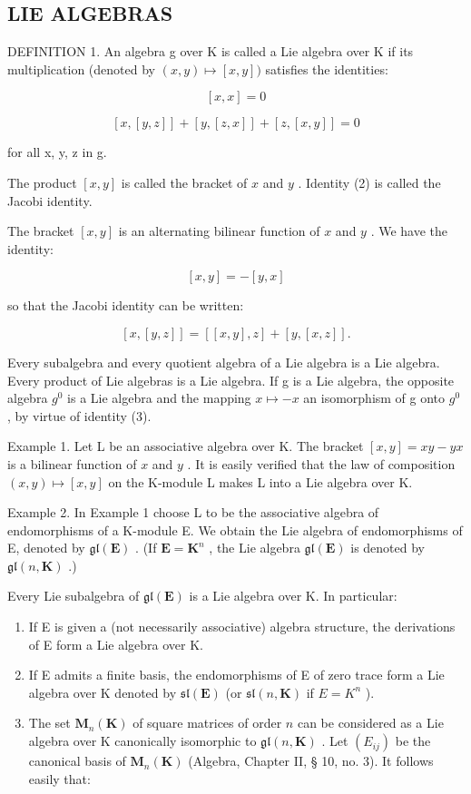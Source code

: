 \subsection{LIE ALGEBRAS}

DEFINITION 1. An algebra g over K is called a Lie algebra over K if its multiplication (denoted by \((x,y)\mapsto [x,y])\) satisfies the identities:

\[
[ x, x ] = 0\tag{1}
\]

\[
[ x, [ y, z ] ] + [ y, [ z, x ] ] + [ z, [ x, y ] ] = 0\tag{2}
\]

for all x, y, z in g.

The product \([x, y]\) is called the bracket of \(x\) and \(y\) . Identity (2) is called the Jacobi identity.

The bracket \([x, y]\) is an alternating bilinear function of \(x\) and \(y\) . We have the identity:

\[
[ x, y ] = - [ y, x ]\tag{3}
\]

so that the Jacobi identity can be written:

\[
[ x, [ y, z ] ] = [ [ x, y ], z ] + [ y, [ x, z ] ].\tag{4}
\]

Every subalgebra and every quotient algebra of a Lie algebra is a Lie algebra. Every product of Lie algebras is a Lie algebra. If g is a Lie algebra, the opposite algebra \(g^{0}\) is a Lie algebra and the mapping \(x \mapsto -x\) an isomorphism of g onto \(g^{0}\) , by virtue of identity (3).

Example 1. Let L be an associative algebra over K. The bracket \([x, y] = xy - yx\) is a bilinear function of \(x\) and \(y\) . It is easily verified that the law of composition \((x, y) \mapsto [x, y]\) on the K-module L makes L into a Lie algebra over K.

Example 2. In Example 1 choose L to be the associative algebra of endomorphisms of a K-module E. We obtain the Lie algebra of endomorphisms of E, denoted by \(\mathfrak{gl}(\mathbf{E})\) . (If \(\mathbf{E} = \mathbf{K}^n\) , the Lie algebra \(\mathfrak{gl}(\mathbf{E})\) is denoted by \(\mathfrak{gl}(n, \mathbf{K})\) .)

Every Lie subalgebra of \(\mathfrak{gl}(\mathbf{E})\) is a Lie algebra over K. In particular:

\begin{enumerate}
\def\labelenumi{(\arabic{enumi})}
\item
  If E is given a (not necessarily associative) algebra structure, the derivations of E form a Lie algebra over K.
\item
  If E admits a finite basis, the endomorphisms of E of zero trace form a Lie algebra over K denoted by \(\mathfrak{sl}(\mathbf{E})\) (or \(\mathfrak{sl}(n,\mathbf{K})\) if \(E = K^{n}\) ).
\item
  The set \(\mathbf{M}_n(\mathbf{K})\) of square matrices of order \(n\) can be considered as a Lie algebra over K canonically isomorphic to \(\mathfrak{gl}(n, \mathbf{K})\) . Let \((E_{ij})\) be the canonical basis of \(\mathbf{M}_n(\mathbf{K})\) (Algebra, Chapter II, § 10, no. 3). It follows easily that:
\end{enumerate}

